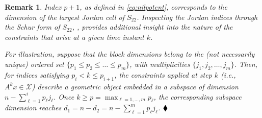 \documentclass[journal,twoside,web]{ieeecolor}
\newtheorem{rem}{Remark}
\newcommand{\eor}{\ensuremath{\hfill\blacklozenge}}
\newtheorem{rem}{Remark}
\newcommand{\eor}{\hfill\ensuremath{\blacklozenge}}
\begin{document}
\begin{rem}
Index $p+1$, as defined in \eqref{eq:nilpotent}, corresponds to the dimension of the largest Jordan cell of $S_{22}$. Inspecting the Jordan indices through the Schur form of $S_{22}$, \cite{kublanovskaya1982construction}, provides additional insight into the nature of the constraints that arise at a given time instant $k$. 

For illustration, suppose that the block dimensions belong to the (not necessarily unique) ordered set $\{p_1 \leq p_2 \leq \ldots \leq p_m\}$, with multiplicities $\{j_1, j_2, \ldots, j_m\}$. Then, for indices satisfying $p_i < k \leq p_{i+1}$, the constraints applied at step $k$ (i.e., $A^k x \in \overline{\mathcal X}$) describe a geometric object embedded in a subspace of dimension $n-\sum_{\ell=1}^{i} p_\ell j_\ell$. Once $k \geq p = \max_{\ell=1,\ldots,m} p_\ell$, the corresponding subspace dimension reaches $d_1 = n-d_2 = n-\sum_{\ell=1}^{m} p_\ell j_\ell$.
    \eor
\end{rem}






\end{document}
